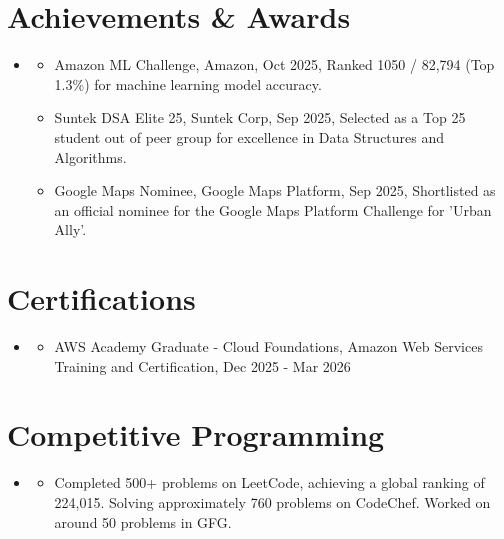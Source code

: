 \documentclass[letterpaper,11pt]{article}
\newcommand{\resumeItem}[1]{
  \item\small{#1 \vspace{-2pt}}
}
\newcommand{\resumeSubHeadingListStart}{\begin{itemize}[leftmargin=0.15in, label={}]}
\newcommand{\resumeSubHeadingListEnd}{\end{itemize}}
\newcommand{\resumeItemListStart}{\begin{itemize}}
\newcommand{\resumeItemListEnd}{\end{itemize}\vspace{-5pt}}
\begin{document}
\section{Achievements \& Awards}
  \resumeSubHeadingListStart
    \item
    \resumeItemListStart
      \resumeItem{Amazon ML Challenge, Amazon, Oct 2025, Ranked 1050 / 82,794 (Top 1.3\%) for machine learning model accuracy.}
      \resumeItem{Suntek DSA Elite 25, Suntek Corp, Sep 2025, Selected as a Top 25 student out of peer group for excellence in Data Structures and Algorithms.}
      \resumeItem{Google Maps Nominee, Google Maps Platform, Sep 2025, Shortlisted as an official nominee for the Google Maps Platform Challenge for 'Urban Ally'.}
    \resumeItemListEnd
  \resumeSubHeadingListEnd


\section{Certifications}
  \resumeSubHeadingListStart
    \item
    \resumeItemListStart
      \resumeItem{AWS Academy Graduate - Cloud Foundations, Amazon Web Services Training and Certification, Dec 2025 - Mar 2026}
    \resumeItemListEnd
  \resumeSubHeadingListEnd


\section{Competitive Programming}
  \resumeSubHeadingListStart
    \item
    \resumeItemListStart
      \resumeItem{Completed 500+ problems on LeetCode, achieving a global ranking of 224,015. Solving approximately 760 problems on CodeChef. Worked on around 50 problems in GFG.}
    \resumeItemListEnd
  \resumeSubHeadingListEnd
\end{document}
